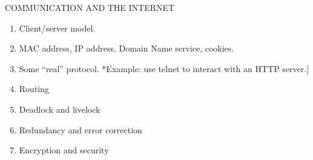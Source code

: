 COMMUNICATION AND THE INTERNET
\begin{enumerate}
\item Client/server model.
\item MAC address, IP address, Domain Name service, cookies.
\item Some “real” protocol. *Example: use telnet to interact with an HTTP server.]
\item Routing
\item Deadlock and livelock
\item Redundancy and error correction
\item Encryption and security
\end{enumerate}


